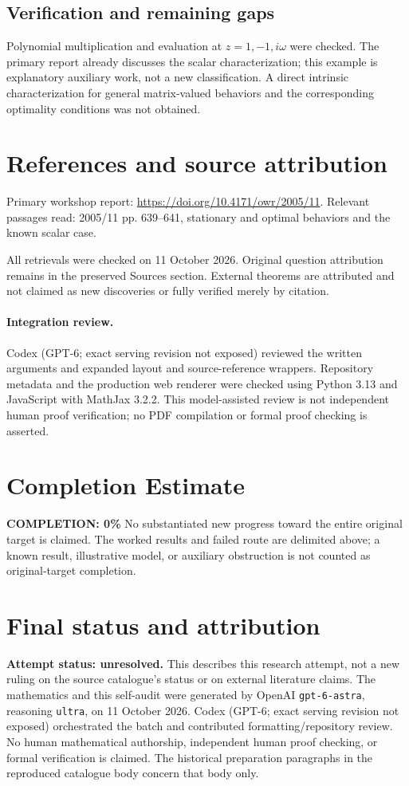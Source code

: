 \documentclass[11pt]{article}
\begin{document}
\subsection{Verification and remaining gaps}
Polynomial multiplication and evaluation at $z=1,-1,i\omega$ were checked. The primary report already discusses the scalar characterization; this example is explanatory auxiliary work, not a new classification. A direct intrinsic characterization for general matrix-valued behaviors and the corresponding optimality conditions was not obtained.

\section{References and source attribution}
Primary workshop report: \url{https://doi.org/10.4171/owr/2005/11}. Relevant passages read: 2005/11 pp. 639--641, stationary and optimal behaviors and the known scalar case.

All retrievals were checked on 11 October 2026. Original question attribution remains in the preserved Sources section. External theorems are attributed and not claimed as new discoveries or fully verified merely by citation.


\paragraph{Integration review.} Codex (GPT-6; exact serving revision not exposed) reviewed the written arguments and expanded layout and source-reference wrappers. Repository metadata and the production web renderer were checked using Python 3.13 and JavaScript with MathJax 3.2.2. This model-assisted review is not independent human proof verification; no PDF compilation or formal proof checking is asserted.

\section{Completion Estimate}
\noindent\textbf{COMPLETION: 0\%}
No substantiated new progress toward the entire original target is claimed. The worked results and failed route are delimited above; a known result, illustrative model, or auxiliary obstruction is not counted as original-target completion.

\section{Final status and attribution}
\textbf{Attempt status: unresolved.} This describes this research attempt, not a new ruling on the source catalogue's status or on external literature claims.
The mathematics and this self-audit were generated by OpenAI \texttt{gpt-6-astra}, reasoning \texttt{ultra}, on 11 October 2026. Codex (GPT-6; exact serving revision not exposed) orchestrated the batch and contributed formatting/repository review. No human mathematical authorship, independent human proof checking, or formal verification is claimed. The historical preparation paragraphs in the reproduced catalogue body concern that body only.
\end{document}
